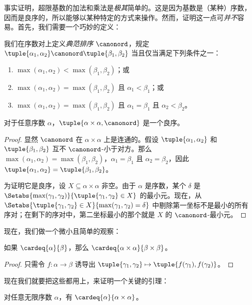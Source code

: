 \documentclass[../../../include/open-logic-section]{subfiles}
\begin{document}


事实证明，超限基数的加法和乘法是\emph{极其}简单的。这是因为基数是（某种）序数，因而是良序的，所以能够以某种特定的方式来操作。然而，证明这一点可\emph{并不}容易。首先，我们需要一个巧妙的定义：

\begin{defn}
我们在序数对上定义\emph{典范排序} $\canonord$，规定 $\tuple{\alpha_1, \alpha_2} \canonord
\tuple{\beta_1, \beta_2}$ 当且仅当满足下列条件之一：
\begin{enumerate}
	\item $\max(\alpha_1, \alpha_2) < \max(\beta_1, \beta_2)$；或
	\item $\max(\alpha_1, \alpha_2) = \max(\beta_1, \beta_2)$ 且 $\alpha_1 < \beta_1$；或
	\item $\max(\alpha_1, \alpha_2) = \max(\beta_1, \beta_2)$ 且 $\alpha_1 = \beta_1$ 且 $\alpha_2 < \beta_2$。
\end{enumerate}
\end{defn}

\begin{lem}
对于任意序数 $\alpha$，$\tuple{\alpha \times \alpha, \canonord}$ 是一个良序。
\end{lem}

\begin{proof}
显然 $\canonord$ 在 $\alpha \times \alpha$ 上是连通的。假设 $\tuple{\alpha_1, \alpha_2}$ 和 $\tuple{\beta_1, \beta_2}$ 互不 $\canonord$-小于对方。那么 $\max(\alpha_1,
\alpha_2) = \max(\beta_1, \beta_2)$，$\alpha_1 = \beta_1$ 且 $\alpha_2 = \beta_2$，因此 $\tuple{\alpha_1, \alpha_2} =
\tuple{\beta_1,  \beta_2}$。

为证明它是良序，设 $X \subseteq \alpha\times\alpha$ 非空。由于 $\alpha$ 是序数，某个 $\delta$ 是 $\Setabs{\max(\gamma_1, \gamma_2)}{\tuple{\gamma_1,
\gamma_2} \in X}$ 的最小元。现在，从 $\Setabs{\tuple{\gamma_1,\gamma_2} \in X}{\max(\gamma_1, \gamma_2) =
\delta}$ 中剔除第一坐标不是最小的所有序对；在剩下的序对中，第二坐标最小的那个就是 $X$ 的 $\canonord$-最小元。
\end{proof}
\noindent
现在，我们做一个微小且简单的观察：

\begin{prop}
如果 $\cardeq{\alpha}{\beta}$，那么 $\cardeq{\alpha \times \alpha}{\beta
\times \beta}$。
\end{prop}

\begin{proof}
只需令 $f \colon \alpha \to \beta$ 诱导出 $\tuple{\gamma_1,
\gamma_2} \mapsto \tuple{f(\gamma_1), f(\gamma_2)}$。
\end{proof}
\noindent
现在我们就要把这些都用上，来证明一个关键的引理：
\begin{lem}
对任意无限序数 $\alpha$，有 $\cardeq{\alpha}{\alpha \times \alpha}$。
\end{lem}
\end{document}
